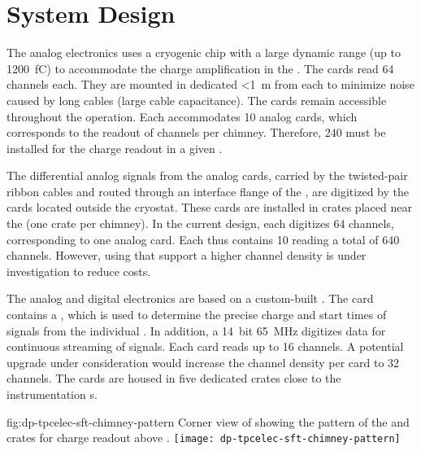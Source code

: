 \section{System Design}
\label{sec:dp-tpcelec-design}

The   analog electronics uses a cryogenic  chip with a large dynamic range (up to \SI{1200}{\femto\coulomb}) to accommodate the charge amplification in the . The  cards read \num{64}  channels each. They are mounted in dedicated   \SI{<1}{\metre} from each  to minimize noise caused by long cables (large cable capacitance). The cards remain accessible throughout the  operation. Each  accommodates \num{10}  analog cards, which corresponds to the readout of %
\dpchperchimney {} channels per chimney. Therefore, \num{240}  must be installed for the charge readout in a given .   

The differential analog signals from the analog  cards, carried by the twisted-pair ribbon cables and routed through an interface flange of the , are digitized by the  cards located outside the cryostat. These cards are installed in  crates placed near the  (one crate per chimney). In the current design, each  digitizes \num{64} channels, corresponding to one  analog card. Each  thus contains \num{10}  reading a total of \num{640} channels. However, using  that support a higher channel density is under investigation to reduce costs. 

The   analog and digital electronics are based on a custom-built . The card contains a   \cite{Blin:2017}, which is used to determine the precise charge and start times of signals from the %
individual . In addition, a \SI{14}{bit} \SI{65}{MHz}  digitizes data for continuous streaming of  signals. Each card reads up to \num{16} channels. %
A potential upgrade under consideration would increase the channel density per card to \num{32} channels. The  cards are housed in five dedicated  crates close to the  instrumentation \fdth{}s.

\begin{dunefigure}{fig:dp-tpcelec-sft-chimney-pattern}
{Corner view of  showing the pattern of the  and  crates for charge readout above .}
\texttt{[image: dp-tpcelec-sft-chimney-pattern]}
\end{dunefigure}

